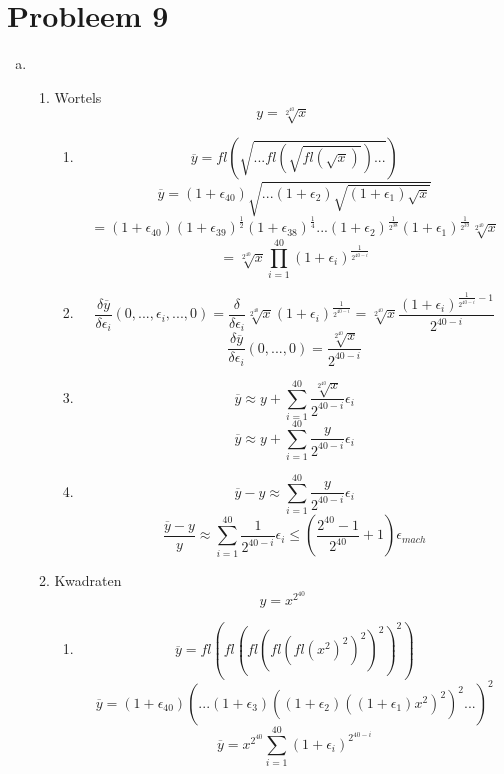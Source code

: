 \documentclass[12pt,a4paper]{article}
\begin{document}
\section{Probleem 9}
\begin{enumerate}[(a)]
\item
\begin{enumerate}
\item Wortels\\
\[
y = \sqrt[2^{40}]{x}
\]
\begin{enumerate}
\item
\[
\overline{y} = fl\left(\sqrt{...fl\left(\sqrt{fl(\sqrt{x})}\right)...}\right)
\]
\[
\overline{y}
= (1+\epsilon_{40})\sqrt{...(1+\epsilon_2)\sqrt{(1+\epsilon_1)\sqrt{x}}}
\]
\[
= (1+\epsilon_{40})(1+\epsilon_{39})^\frac{1}{2}(1+\epsilon_{38})^\frac{1}{4}...(1+\epsilon_{2})^{\frac{1}{2^{38}}}(1+\epsilon_{1})^{\frac{1}{2^{39}}}\sqrt[2^{40}]{x}
\]
\[
= \sqrt[2^{40}]{x}\prod_{i=1}^{40}(1+\epsilon_{i})^{\frac{1}{2^{40-i}}}
\]

\item
\[
\frac{\delta \overline{y}}{\delta\epsilon_i}(0,...,\epsilon_i,...,0)
= \frac{\delta}{\delta\epsilon_i}\sqrt[2^{40}]{x}(1+\epsilon_{i})^{\frac{1}{2^{40-i}}}
= \sqrt[2^{40}]{x}\frac{(1+\epsilon_{i})^{\frac{1}{2^{40-i}}-1}}{2^{40-i}}
\]
\[
\frac{\delta \overline{y}}{\delta\epsilon_i}(0,...,0) = \frac{\sqrt[2^{40}]{x}}{2^{40-i}}
\]

\item 
\[
\overline{y} \approx y +
\sum_{i=1}^{40}
\frac{\sqrt[2^{40}]{x}}{2^{40-i}}
\epsilon_i
\]
\[
\overline{y} \approx y +
\sum_{i=1}^{40}
\frac{y}{2^{40-i}}
\epsilon_i
\]

\item
\[
\overline{y}-y \approx
\sum_{i=1}^{40}
\frac{y}{2^{40-i}}
\epsilon_i
\]
\[
\frac{\overline{y}-y}{y} \approx
\sum_{i=1}^{40}
\frac{1}{2^{40-i}}
\epsilon_i
\le \left(\frac{2^{40}-1}{2^{40}}+1\right)\epsilon_{mach}
\]

\end{enumerate}
\item Kwadraten\\
\[
y = x^{2^{40}}
\]
\begin{enumerate}
\item
\[
\overline{y} = fl\left(fl\left(fl\left(fl\left( fl\left(x^2\right)^2 \right)^2 \right)^2 \right)^2 \right)
\]
\[
\overline{y} = (1+\epsilon_{40})\left(...(1+\epsilon_3)\left((1+\epsilon_2)\left((1+\epsilon_1)x^2\right)^2\right)^2...\right)^2
\]
\[
\overline{y} = x^{2^{40}} \sum_{i=1}^{40}(1+\epsilon_{i})^{2^{40-i}}
\]


\end{enumerate}
\end{enumerate}
\end{enumerate}
\end{document}
